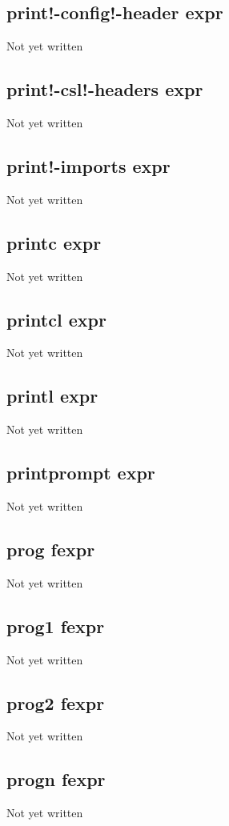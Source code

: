 \documentclass[a4paper,11pt]{article}
\begin{document}
{\subsection{\ttfamily print!-config!-header expr}
   Not yet written

\subsection{\ttfamily print!-csl!-headers expr}
   Not yet written

\subsection{\ttfamily print!-imports expr}
   Not yet written

\subsection{\ttfamily printc expr}
   Not yet written

\subsection{\ttfamily printcl expr}
   Not yet written

\subsection{\ttfamily printl expr}
   Not yet written

\subsection{\ttfamily printprompt expr}
   Not yet written

\subsection{\ttfamily prog fexpr}
   Not yet written

\subsection{\ttfamily prog1 fexpr}
   Not yet written

\subsection{\ttfamily prog2 fexpr}
   Not yet written

\subsection{\ttfamily progn fexpr}
   Not yet written

}
\end{document}
